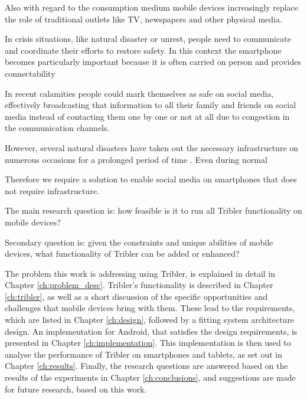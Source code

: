 Also with regard to the consumption medium mobile devices increasingly replace the role of traditional outlets like TV, newspapers and other physical media.

In crisis situations, like natural disaster or unrest, people need to communicate and coordinate their efforts to restore safety.
In this context the smartphone becomes particularly important because it is often carried on person and provides connectability

In recent calamities \cite{earthquake-nepal, etc...} people could mark themselves as safe on social media, effectively broadcasting that information to all their family and friends on social media instead of contacting them one by one or not at all due to congestion in the communication channels.

However, several natural disasters have taken out the necessary infrastructure on numerous occasions for a prolonged period of time \cite{renesys2005katrina}.
Even during normal 

Therefore we require a solution to enable social media on smartphones that does not require infrastructure. %




The main research question is: how feasible is it to run all Tribler functionality on mobile devices? %

Secondary question is: given the constraints and unique abilities of mobile devices, what functionality of Tribler can be added or enhanced?






The problem this work is addressing using Tribler, is explained in detail in Chapter \ref{ch:problem_desc}.
Tribler's functionality is described in Chapter \ref{ch:tribler}, as well as a short discussion of the specific opportunities and challenges that mobile devices bring with them.
These lead to the requirements, which are listed in Chapter \ref{ch:design}, followed by a fitting system architecture design.
An implementation for Android, that satisfies the design requirements, is presented in Chapter \ref{ch:implementation}.
This implementation is then used to analyse the performance of Tribler on smartphones and tablets, as set out in Chapter \ref{ch:results}.
Finally, the research questions are answered based on the results of the experiments in Chapter \ref{ch:conclusions}, and suggestions are made for future research, based on this work.

